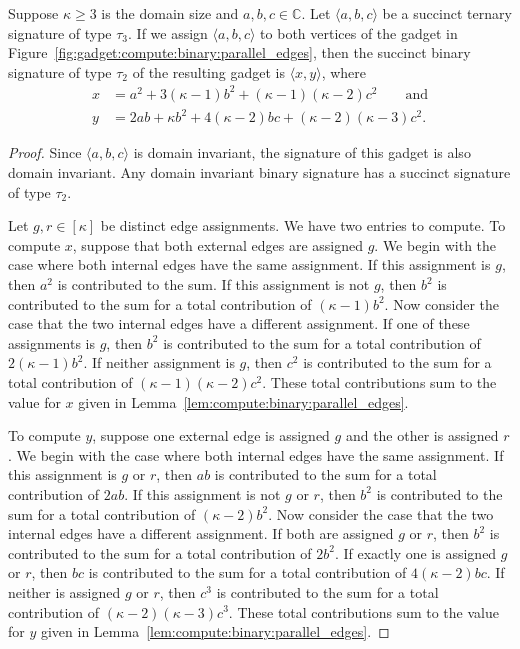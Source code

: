 \documentclass[11pt]{article}
\begin{document}
\begin{lemma} \label{lem:compute:binary:parallel_edges}
 Suppose $\kappa \ge 3$ is the domain size and $a,b,c \in \mathbb{C}$.
 Let $\langle a,b,c \rangle$ be a succinct ternary signature of type $\tau_3$.
 If we assign $\langle a,b,c \rangle$ to both vertices of the gadget in Figure~\ref{fig:gadget:compute:binary:parallel_edges},
 then the succinct binary signature of type $\tau_2$ of the resulting gadget is $\langle x, y \rangle$,
 where
 \begin{align*}
  x &=   a^2
       + 3 (\kappa - 1) b^2
       + (\kappa - 1) (\kappa - 2) c^2
       \qquad \text{and}\\
  y &=   2 a b
       + \kappa b^2
       + 4 (\kappa - 2) b c
       + (\kappa - 2) (\kappa - 3) c^2.
 \end{align*}
\end{lemma}

\begin{proof}
 Since $\langle a,b,c \rangle$ is domain invariant,
 the signature of this gadget is also domain invariant.
 Any domain invariant binary signature has a succinct signature of type $\tau_2$.
 
 Let $g,r \in [\kappa]$ be distinct edge assignments.
 We have two entries to compute.
 To compute $x$,
 suppose that both external edges are assigned $g$.
 We begin with the case where both internal edges have the same assignment.
 If this assignment is $g$,
 then $a^2$ is contributed to the sum.
 If this assignment is not $g$,
 then $b^2$ is contributed to the sum for a total contribution of $(\kappa - 1) b^2$.
 Now consider the case that the two internal edges have a different assignment.
 If one of these assignments is $g$,
 then $b^2$ is contributed to the sum for a total contribution of $2 (\kappa - 1) b^2$.
 If neither assignment is $g$,
 then $c^2$ is contributed to the sum for a total contribution of $(\kappa - 1) (\kappa - 2) c^2$.
 These total contributions sum to the value for $x$ given in Lemma~\ref{lem:compute:binary:parallel_edges}.
 
 To compute $y$,
 suppose one external edge is assigned $g$ and the other is assigned $r$.
 We begin with the case where both internal edges have the same assignment.
 If this assignment is $g$ or $r$,
 then $a b$ is contributed to the sum for a total contribution of $2 a b$.
 If this assignment is not $g$ or $r$,
 then $b^2$ is contributed to the sum for a total contribution of $(\kappa - 2) b^2$.
 Now consider the case that the two internal edges have a different assignment.
 If both are assigned $g$ or $r$,
 then $b^2$ is contributed to the sum for a total contribution of $2 b^2$.
 If exactly one is assigned $g$ or $r$,
 then $b c$ is contributed to the sum for a total contribution of $4 (\kappa - 2) b c$.
 If neither is assigned $g$ or $r$,
 then $c^3$ is contributed to the sum for a total contribution of $(\kappa - 2) (\kappa - 3) c^3$.
 These total contributions sum to the value for $y$ given in Lemma~\ref{lem:compute:binary:parallel_edges}.
\end{proof}
\end{document}

